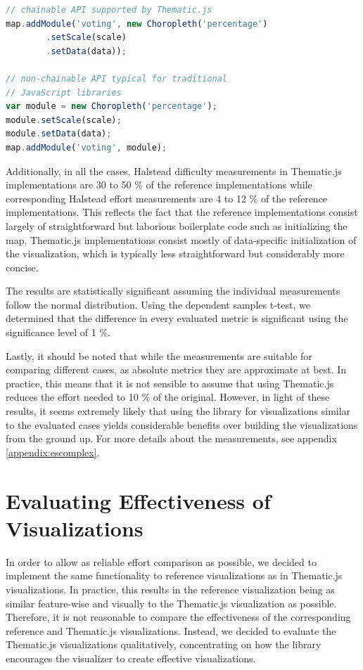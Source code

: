 \begin{lstlisting}[caption=Thematic.js API format. The code has been simplified to increase readability.,language=JavaScript,label=listing:chainableapi]
// chainable API supported by Thematic.js
map.addModule('voting', new Choropleth('percentage')
        .setScale(scale)
        .setData(data));

// non-chainable API typical for traditional
// JavaScript libraries
var module = new Choropleth('percentage');
module.setScale(scale);
module.setData(data);
map.addModule('voting', module);
\end{lstlisting}

Additionally, in all the cases, Halstead difficulty measurements in Thematic.js implementations are 30 to 50 \% of the reference implementations while corresponding Halstead effort measurements are 4 to 12 \% of the reference implementations. This reflects the fact that the reference implementations consist largely of straightforward but laborious boilerplate code such as initializing the map. Thematic.js implementations consist mostly of data-specific initialization of the visualization, which is typically less straightforward but considerably more concise.

The results are statistically significant assuming the individual measurements follow the normal distribution. Using the dependent samples t-test, we determined that the difference in every evaluated metric is significant using the significance level of 1 \%.

Lastly, it should be noted that while the measurements are suitable for comparing different cases, as absolute metrics they are approximate at best. In practice, this means that it is not sensible to assume that using Thematic.js reduces the effort needed to 10 \% of the original. However, in light of these results, it seems extremely likely that using the library for visualizations similar to the evaluated cases yields considerable benefits over building the visualizations from the ground up. For more details about the measurements, see appendix \ref{appendix:escomplex}.

\section{Evaluating Effectiveness of Visualizations}
\label{section:evaluatingeffectiveness}

In order to allow as reliable effort comparison as possible, we decided to implement the same functionality to reference visualizations as in Thematic.js visualizations. In practice, this results in the reference visualization being as similar feature-wise and visually to the Thematic.js visualization as possible. Therefore, it is not reasonable to compare the effectiveness of the corresponding reference and Thematic.js visualizations. Instead, we decided to evaluate the Thematic.js visualizations qualitatively, concentrating on how the library encourages the visualizer to create effective visualizations.

